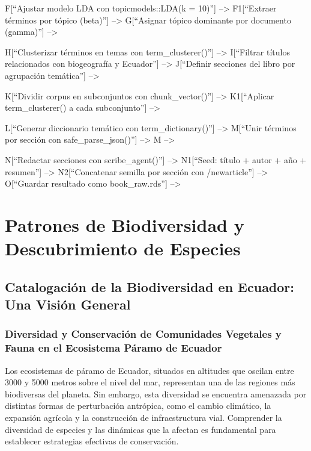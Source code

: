 \documentclass[
  letterpaper,
  DIV=11,
  numbers=noendperiod,
  oneside]{scrreprt}
\begin{document}
F{[}``Ajustar modelo LDA con topicmodels::LDA(k = 10)''{]}
--\textgreater{} F1{[}``Extraer términos por tópico (beta)''{]}
--\textgreater{} G{[}``Asignar tópico dominante por documento
(gamma)''{]} --\textgreater{}

H{[}``Clusterizar términos en temas con term\_clusterer()''{]}
--\textgreater{} I{[}``Filtrar títulos relacionados con biogeografía y
Ecuador''{]} --\textgreater{} J{[}``Definir secciones del libro por
agrupación temática''{]} --\textgreater{}

K{[}``Dividir corpus en subconjuntos con chunk\_vector()''{]}
--\textgreater{} K1{[}``Aplicar term\_clusterer() a cada
subconjunto''{]} --\textgreater{}

L{[}``Generar diccionario temático con term\_dictionary()''{]}
--\textgreater{} M{[}``Unir términos por sección con
safe\_parse\_json()''{]} --\textgreater{} M --\textgreater{}

N{[}``Redactar secciones con scribe\_agent()''{]} --\textgreater{}
N1{[}``Seed: título + autor + año + resumen''{]} --\textgreater{}
N2{[}``Concatenar semilla por sección con /newarticle''{]}
--\textgreater{} O{[}``Guardar resultado como book\_raw.rds''{]}
--\textgreater{}

\part{Patrones de Biodiversidad y Descubrimiento de Especies}

\chapter{Catalogación de la Biodiversidad en Ecuador: Una Visión
General}\label{catalogaciuxf3n-de-la-biodiversidad-en-ecuador-una-visiuxf3n-general}

\section{Diversidad y Conservación de Comunidades Vegetales y Fauna en
el Ecosistema Páramo de
Ecuador}\label{diversidad-y-conservaciuxf3n-de-comunidades-vegetales-y-fauna-en-el-ecosistema-puxe1ramo-de-ecuador}

Los ecosistemas de páramo de Ecuador, situados en altitudes que oscilan
entre 3000 y 5000 metros sobre el nivel del mar, representan una de las
regiones más biodiversas del planeta. Sin embargo, esta diversidad se
encuentra amenazada por distintas formas de perturbación antrópica, como
el cambio climático, la expansión agrícola y la construcción de
infraestructura vial. Comprender la diversidad de especies y las
dinámicas que la afectan es fundamental para establecer estrategias
efectivas de conservación.
\end{document}
